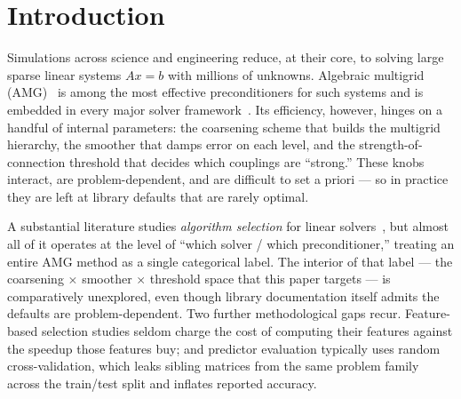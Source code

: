 \documentclass[acmsmall,screen,review]{acmart}
\begin{document}


\maketitle

\section{Introduction}
\label{sec:intro}

Simulations across science and engineering reduce, at their core, to solving
large sparse linear systems $Ax=b$ with millions of unknowns. Algebraic
multigrid (AMG)~\cite{ruge1987,stuben2001,vanek1996} is among the most
effective preconditioners for such systems and is embedded in every major
solver framework~\cite{petsc,trilinos,hypre,amgcl}. Its efficiency, however,
hinges on a handful of internal parameters: the coarsening scheme that builds
the multigrid hierarchy, the smoother that damps error on each level, and the
strength-of-connection threshold that decides which couplings are ``strong.''
These knobs interact, are problem-dependent, and are difficult to set a priori
--- so in practice they are left at library defaults that are rarely optimal.

A substantial literature studies \emph{algorithm selection} for linear
solvers~\cite{rice1976,bhowmick2009,sood2019,tang2022}, but almost all of it
operates at the level of ``which solver / which preconditioner,'' treating an
entire AMG method as a single categorical label. The interior of that label ---
the coarsening $\times$ smoother $\times$ threshold space that this paper
targets --- is comparatively unexplored, even though library documentation
itself admits the defaults are problem-dependent. Two further methodological
gaps recur. Feature-based selection studies seldom charge the cost of computing
their features against the speedup those features buy; and predictor evaluation
typically uses random cross-validation, which leaks sibling matrices from the
same problem family across the train/test split and inflates reported accuracy.
\end{document}
